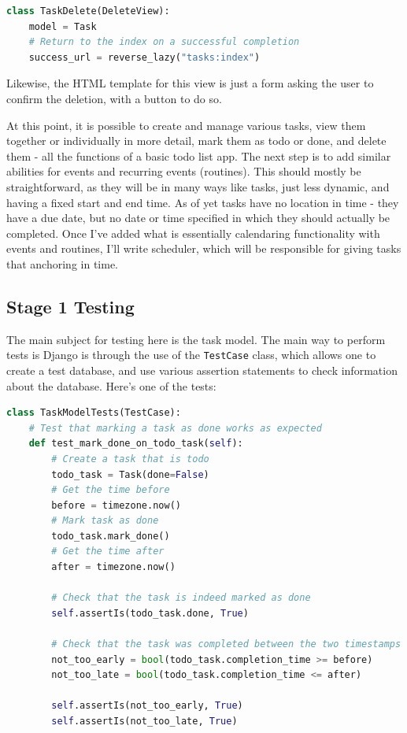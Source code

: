 \documentclass{article}
\begin{document}
\begin{lstlisting}[language=Python]
class TaskDelete(DeleteView):
    model = Task
    # Return to the index on a successful completion
    success_url = reverse_lazy("tasks:index")
\end{lstlisting}

Likewise,
the HTML template for this view is just a form asking the user to confirm the deletion,
with a button to do so.

At this point,
it is possible to create and manage various tasks,
view them together or individually in more detail,
mark them as todo or done,
and delete them -
all the functions of a basic todo list app.
The next step is to add similar abilities for events and recurring events (routines).
This should mostly be straightforward,
as they will be in many ways like tasks,
just less dynamic,
and having a fixed start and end time.
As of yet tasks have no location in time -
they have a due date,
but no date or time specified in which they should actually be completed.
Once I've added what is essentially calendaring functionality with events and routines,
I'll write scheduler,
which will be responsible for giving tasks that anchoring in time.

\subsection{Stage 1 Testing}
The main subject for testing here is the task model.
The main way to perform tests is Django is through the use of the \texttt{TestCase} class,
which allows one to create a test database,
and use various assertion statements to check information about the database.
Here's one of the tests:
\begin{lstlisting}[language=Python]
class TaskModelTests(TestCase):
    # Test that marking a task as done works as expected
    def test_mark_done_on_todo_task(self):
        # Create a task that is todo
        todo_task = Task(done=False)
        # Get the time before
        before = timezone.now()
        # Mark task as done
        todo_task.mark_done()
        # Get the time after
        after = timezone.now()

        # Check that the task is indeed marked as done
        self.assertIs(todo_task.done, True)

        # Check that the task was completed between the two timestamps
        not_too_early = bool(todo_task.completion_time >= before)
        not_too_late = bool(todo_task.completion_time <= after)

        self.assertIs(not_too_early, True)
        self.assertIs(not_too_late, True)
\end{lstlisting}
\end{document}
